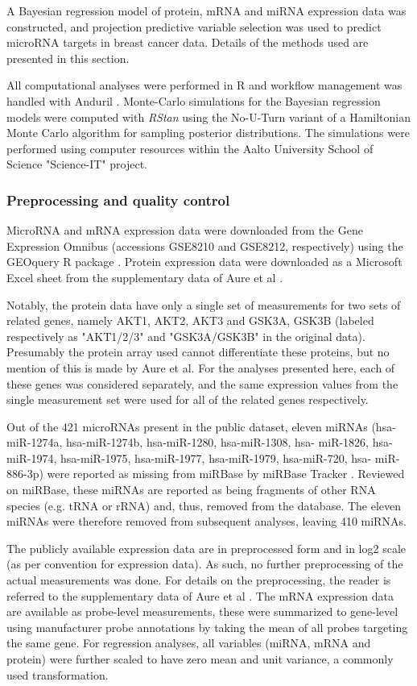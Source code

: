A Bayesian regression model of protein, mRNA and miRNA expression data was
constructed, and projection predictive variable selection was used to predict
microRNA targets in breast cancer data. Details of the methods used are
presented in this section.

All computational analyses were performed in R
\citep{R} and workflow management was handled with Anduril \citep{Ovaska2010}.
Monte-Carlo simulations for the Bayesian regression models were computed with
\emph{RStan} \citep{RStan} using the No-U-Turn variant of a Hamiltonian Monte Carlo
algorithm for sampling posterior distributions. The simulations were performed using
computer resources within the Aalto University School of Science "Science-IT"
project.


\subsubsection{Preprocessing and quality control}

MicroRNA and mRNA expression data were downloaded from the Gene Expression
Omnibus \citep{Edgar2002} (accessions GSE8210 and GSE8212, respectively) using
the GEOquery R package \citep{Davis2007}. Protein expression data were
downloaded as a Microsoft Excel sheet from the supplementary data of Aure et
al \citep{Aure2015}.

Notably, the protein data have only a single set of measurements for two sets
of related genes, namely AKT1, AKT2, AKT3 and GSK3A, GSK3B (labeled
respectively as "AKT1/2/3" and "GSK3A/GSK3B" in the original data). Presumably
the protein array used cannot differentiate these proteins, but
no mention of this is made by Aure et al. For the analyses presented here,
each of these genes was considered separately, and the same expression values
from the single measurement set were used for all of the related genes
respectively.

Out of the 421 microRNAs present in the public dataset, eleven miRNAs (hsa-
miR-1274a, hsa-miR-1274b, hsa-miR-1280, hsa-miR-1308, hsa- miR-1826, hsa-
miR-1974, hsa-miR-1975, hsa-miR-1977, hsa-miR-1979, hsa-miR-720, hsa-
miR-886-3p) were reported as missing from miRBase by miRBase Tracker \citep{VanPeer2014}.
Reviewed on miRBase, these miRNAs are reported as being fragments of other RNA species
(e.g. tRNA or rRNA) and, thus, removed from the database. The eleven miRNAs
were therefore removed from subsequent analyses, leaving 410 miRNAs.

The publicly available expression data are in preprocessed form and 
in log2 scale (as per convention for expression data). As such,
no further preprocessing of the actual measurements was done. For details on
the preprocessing, the reader is referred to the supplementary data of Aure et
al \citep{Aure2015}. The mRNA expression data are available as probe-level
measurements, these were summarized to gene-level using manufacturer probe
annotations by taking the mean of all probes targeting the same gene.
For regression analyses, all variables (miRNA, mRNA
and protein) were further scaled to have zero mean and unit variance,
a commonly used transformation.

